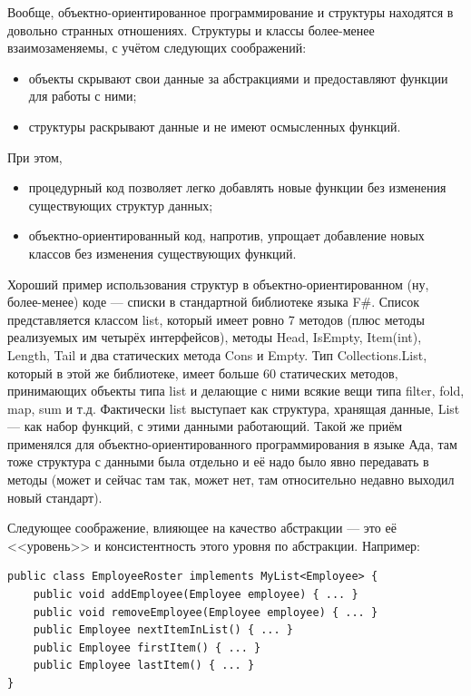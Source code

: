 \documentclass[a5paper]{article}
\begin{document}
Вообще, объектно-ориентированное программирование и структуры находятся в довольно странных отношениях. Структуры и классы более-менее взаимозаменяемы, с учётом следующих соображений:

\begin{itemize}
    \item объекты скрывают свои данные за абстракциями и предоставляют функции для работы с ними;
    \item структуры раскрывают данные и не имеют осмысленных функций.
\end{itemize}

При этом,
\begin{itemize}
    \item процедурный код позволяет легко добавлять новые функции без изменения существующих структур данных;
    \item объектно-ориентированный код, напротив, упрощает добавление новых классов без изменения существующих функций.
\end{itemize}

Хороший пример использования структур в объектно-ориентированном (ну, более-менее) коде --- списки в стандартной библиотеке языка F\#. Список представляется классом list, который имеет ровно 7 методов (плюс методы реализуемых им четырёх интерфейсов), методы Head, IsEmpty, Item(int), Length, Tail и два статических метода Cons и Empty. Тип Collections.List, который в этой же библиотеке, имеет больше 60 статических методов, принимающих объекты типа list и делающие с ними всякие вещи типа filter, fold, map, sum и т.д. Фактически list выступает как структура, хранящая данные, List --- как набор функций, с этими данными работающий. Такой же приём применялся для объектно-ориентированного программирования в языке Ада, там тоже структура с данными была отдельно и её надо было явно передавать в методы (может и сейчас там так, может нет, там относительно недавно выходил новый стандарт).

Следующее соображение, влияющее на качество абстракции --- это её <<уровень>> и консистентность этого уровня по абстракции. Например:

\begin{verbatim}
public class EmployeeRoster implements MyList<Employee> {
    public void addEmployee(Employee employee) { ... }
    public void removeEmployee(Employee employee) { ... }
    public Employee nextItemInList() { ... }
    public Employee firstItem() { ... }
    public Employee lastItem() { ... }
}
\end{verbatim}
\end{document}
